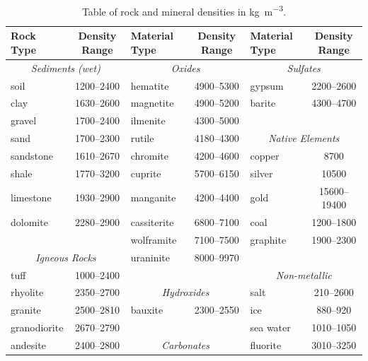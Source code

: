 \begin{table}
    \begin{threeparttable}
    \caption{Table of rock and mineral densities in \si{kg.m^{-3}}.}
    \label{tab-density}
    \begin{tabular}{@{}lclclc@{}}
        \toprule
        Rock Type &
        Density Range &
        Material Type &
        Density Range & 
        Material Type &
        Density Range \\

        \midrule
        \multicolumn{2}{c}{\it Sediments (wet)} & \multicolumn{2}{c}{\it Oxides} & \multicolumn{2}{c}{\it Sulfates} \\
        soil        & 1200--2400    & hematite      & 4900--5300 & gypsum        & 2200--2600 \\
        clay        & 1630--2600    & magnetite     & 4900--5200 & barite        & 4300--4700 \\
        gravel      & 1700--2400    & ilmenite      & 4300--5000 \\
        sand        & 1700--2300    & rutile        & 4180--4300 & \multicolumn{2}{c}{\it Native Elements} \\
        sandstone   & 1610--2670    & chromite      & 4200--4600 & copper        & 8700 \\
        shale       & 1770--3200    & cuprite       & 5700--6150 & silver        & 10500 \\
        limestone   & 1930--2900    & manganite     & 4200--4400 & gold          & 15600--19400 \\
        dolomite    & 2280--2900    & cassiterite   & 6800--7100 & coal          & 1200--1800 \\
        {}          & {}            & wolframite    & 7100--7500 & graphite      & 1900--2300 \\
        \multicolumn{2}{c}{\it Igneous Rocks} & uraninite     & 8000--9970 \\
        tuff        & 1000--2400    & {}            & {}         & \multicolumn{2}{c}{\it Non-metallic} \\
        rhyolite    & 2350--2700    & \multicolumn{2}{c}{\it Hydroxides} & salt          & 210--2600 \\
        granite     & 2500--2810    & bauxite       & 2300--2550 & ice           & 880--920 \\
        granodiorite & 2670--2790   & {}            & {}         & sea water     & 1010--1050 \\
        andesite    & 2400--2800    & \multicolumn{2}{c}{\it Carbonates} & fluorite      & 3010--3250 \\ 

\end{tabular}
\end{threeparttable}
\end{table}
